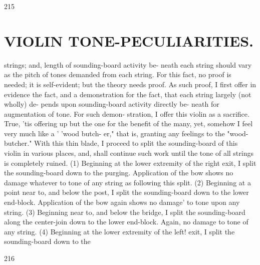\documentclass{article}
\begin{document}
215

\section*{VIOLIN TONE-PECULIARITIES.}
strings; and, length of sounding-board activity be- neath each string should vary as the pitch of tones demanded from each string. For this fact, no proof is needed; it is self-evident; but the theory needs proof. As such proof, I first offer in evidence the fact, and a demonstration for the fact, that each string largely (not wholly) de- pends upon sounding-board activity directly be- neath for augmentation of tone. For such demon- stration, I offer this violin as a sacrifice. True, 'tis offering up but the one for the benefit of the many, yet, somehow I feel very much like a ' 'wood butch- er," that is, granting any feelings to the "wood- butcher." With this thin blade, I proceed to split the sounding-board of this violin in various places, and, shall continue such work until the tone of all strings is completely ruined. (1) Beginning at the lower extremity of the right exit, I split the sounding-board down to the purging. Application of the bow shows no damage whatever to tone of any string as following this split. (2) Beginning at a point near to, and below the post, I split the sounding-board down to the lower end-block. Application of the bow again shows no damage' to tone upon any string. (3) Beginning near to, and below the bridge, I split the sounding-board along the center-join down to the lower end-block. Again, no damage to tone of any string. (4) Beginning at the lower extremity of the left! exit, I split the sounding-board down to the

216
\end{document}

